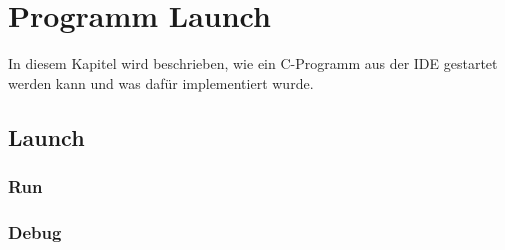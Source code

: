 \chapter{Programm Launch}
In diesem Kapitel wird beschrieben, wie ein C-Programm aus der IDE gestartet werden kann und was dafür implementiert wurde.

\section{Launch}
\subsection{Run}
\subsection{Debug}



